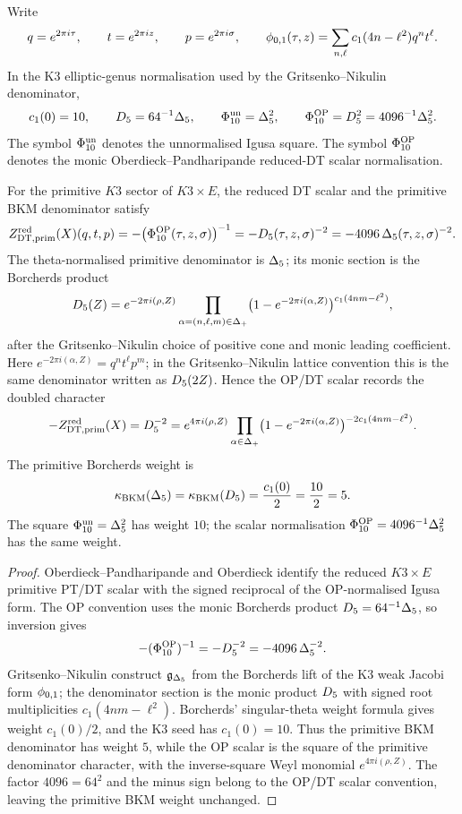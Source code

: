 Write
\[
 q=e^{2\pi i\tau},\qquad t=e^{2\pi iz},\qquad p=e^{2\pi i\sigma},
 \qquad
 \phi_{0,1}(\tau,z)=\sum_{n,\ell}c_1(4n-\ell^2)q^n t^\ell .
\]
In the K3 elliptic-genus normalisation used by the
Gritsenko--Nikulin denominator,
\[
 c_1(0)=10,\qquad
 D_{5}=64^{-1}\Delta_{5},\qquad
 \Phi_{10}^{\mathrm{un}}=\Delta_{5}^2,\qquad
 \Phi_{10}^{\mathrm{OP}}=D_{5}^2=4096^{-1}\Delta_{5}^2 .
\]
The symbol $\Phi_{10}^{\mathrm{un}}$ denotes the unnormalised Igusa square. The symbol
$\Phi_{10}^{\mathrm{OP}}$ denotes the monic Oberdieck--Pandharipande reduced-DT scalar
normalisation.

\begin{theorem}[Primitive $N=1$ character theorem]
\label{thm:n1-character-k3e}
For the primitive $K3$ sector of $K3\times E$, the reduced DT scalar and
the primitive BKM denominator satisfy
\[
 Z^{\mathrm{red}}_{\mathrm{DT},\mathrm{prim}}(X)(q,t,p)
 =-\bigl(\Phi_{10}^{\mathrm{OP}}(\tau,z,\sigma)\bigr)^{-1}
 =-D_{5}(\tau,z,\sigma)^{-2}
 =-4096\,\Delta_{5}(\tau,z,\sigma)^{-2}.
\]
The theta-normalised primitive denominator is $\Delta_{5}$; its monic
section is the Borcherds product
\[
 D_{5}(Z)
 =e^{-2\pi i(\rho,Z)}
  \prod_{\alpha=(n,\ell,m)\in\Delta_+}
  \bigl(1-e^{-2\pi i(\alpha,Z)}\bigr)^{c_1(4nm-\ell^2)} ,
\]
after the Gritsenko--Nikulin choice of positive cone and monic leading
coefficient. Here $e^{-2\pi i(\alpha,Z)}=q^n t^\ell p^m$; in the
Gritsenko--Nikulin lattice convention this is the same denominator
written as $D_{5}(2Z)$. Hence the OP/DT scalar records the doubled
character
\[
 -Z^{\mathrm{red}}_{\mathrm{DT},\mathrm{prim}}(X)=D_{5}^{-2}
 =
 e^{4\pi i(\rho,Z)}
 \prod_{\alpha\in\Delta_+}
 \bigl(1-e^{-2\pi i(\alpha,Z)}\bigr)^{-2c_1(4nm-\ell^2)} .
\]
The primitive Borcherds weight is
\[
 \kappa_{\mathrm{BKM}}(\Delta_{5})
 =\kappa_{\mathrm{BKM}}(D_{5})
 =\frac{c_1(0)}{2}
 =\frac{10}{2}
 =5.
\]
The square $\Phi_{10}^{\mathrm{un}}=\Delta_{5}^2$ has weight $10$; the scalar
normalisation $\Phi_{10}^{\mathrm{OP}}=4096^{-1}\Delta_{5}^2$ has the same weight.
\end{theorem}

\begin{proof}
Oberdieck--Pandharipande and Oberdieck identify the reduced
$K3\times E$ primitive PT/DT scalar with the signed reciprocal of the
OP-normalised Igusa form. The OP convention uses the monic Borcherds
product $D_{5}=64^{-1}\Delta_{5}$, so inversion gives
\[
 -(\Phi_{10}^{\mathrm{OP}})^{-1}=-D_{5}^{-2}=-4096\,\Delta_{5}^{-2}.
\]
Gritsenko--Nikulin construct $\mathfrak{g}_{\Delta_{5}}$ from the Borcherds lift of
the K3 weak Jacobi form $\phi_{0,1}$; the denominator section is the
monic product $D_{5}$ with signed root multiplicities
$c_1(4nm-\ell^2)$. Borcherds' singular-theta weight formula gives
weight $c_1(0)/2$, and the K3 seed has $c_1(0)=10$. Thus the primitive
BKM denominator has weight $5$, while the OP scalar is the square of
the primitive denominator character, with the inverse-square Weyl
monomial $e^{4\pi i(\rho,Z)}$. The factor $4096=64^2$ and the minus sign
belong to the OP/DT scalar convention, leaving the primitive
BKM weight unchanged.
\end{proof}

